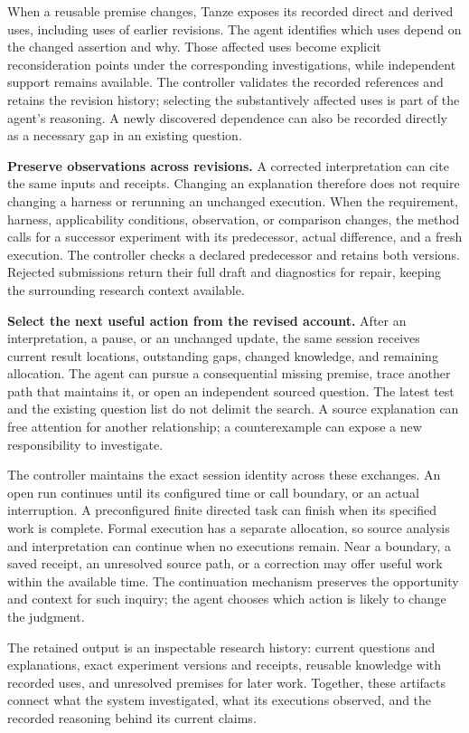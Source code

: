 \documentclass[10pt,twocolumn,letterpaper]{article}
\newcommand{\sys}{Tanze}
\begin{document}
When a reusable premise changes, \sys{} exposes its recorded direct and derived uses, including uses of earlier revisions. The agent identifies which uses depend on the changed assertion and why. Those affected uses become explicit reconsideration points under the corresponding investigations, while independent support remains available. The controller validates the recorded references and retains the revision history; selecting the substantively affected uses is part of the agent's reasoning. A newly discovered dependence can also be recorded directly as a necessary gap in an existing question.

\textbf{Preserve observations across revisions.}
A corrected interpretation can cite the same inputs and receipts. Changing an explanation therefore does not require changing a harness or rerunning an unchanged execution. When the requirement, harness, applicability conditions, observation, or comparison changes, the method calls for a successor experiment with its predecessor, actual difference, and a fresh execution. The controller checks a declared predecessor and retains both versions. Rejected submissions return their full draft and diagnostics for repair, keeping the surrounding research context available.

\textbf{Select the next useful action from the revised account.}
After an interpretation, a pause, or an unchanged update, the same session receives current result locations, outstanding gaps, changed knowledge, and remaining allocation. The agent can pursue a consequential missing premise, trace another path that maintains it, or open an independent sourced question. The latest test and the existing question list do not delimit the search. A source explanation can free attention for another relationship; a counterexample can expose a new responsibility to investigate.

The controller maintains the exact session identity across these exchanges. An open run continues until its configured time or call boundary, or an actual interruption. A preconfigured finite directed task can finish when its specified work is complete. Formal execution has a separate allocation, so source analysis and interpretation can continue when no executions remain. Near a boundary, a saved receipt, an unresolved source path, or a correction may offer useful work within the available time. The continuation mechanism preserves the opportunity and context for such inquiry; the agent chooses which action is likely to change the judgment.

The retained output is an inspectable research history: current questions and explanations, exact experiment versions and receipts, reusable knowledge with recorded uses, and unresolved premises for later work. Together, these artifacts connect what the system investigated, what its executions observed, and the recorded reasoning behind its current claims.



\end{document}
